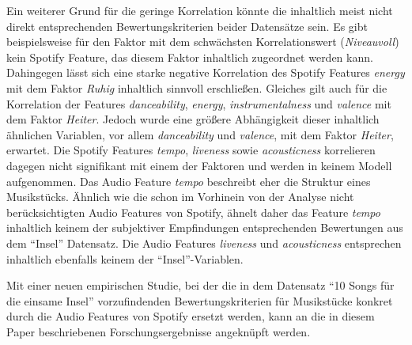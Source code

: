 Ein weiterer Grund für die geringe Korrelation könnte die inhaltlich meist nicht direkt entsprechenden Bewertungskriterien beider Datensätze sein.
Es gibt beispielsweise für den Faktor mit dem schwächsten Korrelationswert (\textit{Niveauvoll}) kein Spotify Feature, das diesem Faktor inhaltlich zugeordnet werden kann.
Dahingegen lässt sich eine starke negative Korrelation des Spotify Features \textit{energy} mit dem Faktor \textit{Ruhig} inhaltlich sinnvoll erschließen.
Gleiches gilt auch für die Korrelation der Features \textit{danceability}, \textit{energy}, \textit{instrumentalness} und \textit{valence} mit dem Faktor \textit{Heiter}.
Jedoch wurde eine größere Abhängigkeit dieser inhaltlich ähnlichen Variablen, vor allem \textit{danceability} und \textit{valence}, mit dem Faktor \textit{Heiter}, erwartet.
Die Spotify Features \textit{tempo}, \textit{liveness} sowie \textit{acousticness} korrelieren dagegen nicht signifikant mit einem der Faktoren und werden in keinem Modell aufgenommen. 
Das Audio Feature \textit{tempo} beschreibt eher die Struktur eines Musikstücks.
Ähnlich wie die schon im Vorhinein von der Analyse nicht berücksichtigten Audio Features von Spotify, ähnelt daher das Feature \textit{tempo} inhaltlich keinem der subjektiver Empfindungen entsprechenden Bewertungen aus dem "`Insel"' Datensatz.
Die Audio Features \textit{liveness} und \textit{acousticness} entsprechen inhaltlich ebenfalls keinem der "`Insel"'-Variablen.  

Mit einer neuen empirischen Studie, bei der die in dem Datensatz "`10 Songs für die einsame Insel"' vorzufindenden Bewertungskriterien für Musikstücke konkret durch die Audio Features von Spotify ersetzt werden, kann an die in diesem Paper beschriebenen Forschungsergebnisse angeknüpft werden.




